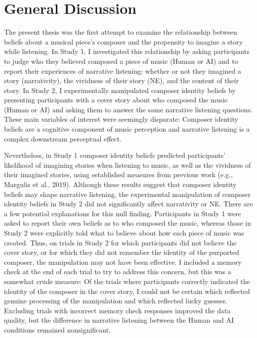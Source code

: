 \documentclass[12pt,twoside]{reedthesis}
\begin{document}
\chapter*{General Discussion}
The present thesis was the first attempt to examine the relationship between beliefs about a musical piece’s composer and the propensity to imagine a story while listening. In Study 1, I investigated this relationship by asking participants to judge who they believed composed a piece of music (Human or AI) and to report their experiences of narrative listening: whether or not they imagined a story (narrativity), the vividness of their story (NE), and the content of their story. In Study 2, I experimentally manipulated composer identity beliefs by presenting participants with a cover story about who composed the music (Human or AI) and asking them to answer the same narrative listening questions. These main variables of interest were seemingly disparate: Composer identity beliefs are a cognitive component of music perception and narrative listening is a complex downstream perceptual effect. 

Nevertheless, in Study 1 composer identity beliefs predicted participants’ likelihood of imagining stories when listening to music, as well as the vividness of their imagined stories, using established measures from previous work (e.g., Margulis et al., 2019). Although these results suggest that composer identity beliefs may shape narrative listening, the experimental manipulation of composer identity beliefs in Study 2 did not significantly affect narrativity or NE. There are a few potential explanations for this null finding. Participants in Study 1 were asked to report their own beliefs as to who composed the music, whereas those in Study 2 were explicitly told what to believe about how each piece of music was created. Thus, on trials in Study 2 for which participants did not believe the cover story, or for which they did not remember the identity of the purported composer, the manipulation may not have been effective. I included a memory check at the end of each trial to try to address this concern, but this was a somewhat crude measure: Of the trials where participants correctly indicated the identity of the composer in the cover story, I could not be certain which reflected genuine processing of the manipulation and which reflected lucky guesses. Excluding trials with incorrect memory check responses improved the data quality, but the difference in narrative listening between the Human and AI conditions remained nonsignificant.
\end{document}

